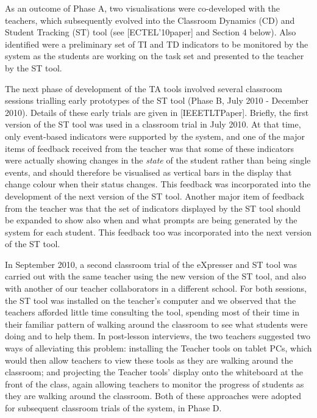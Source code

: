 As an outcome of Phase A, two visualisations were co-developed with
the teachers, which subsequently evolved into the Classroom Dynamics
(CD) and Student Tracking (ST) tool (see [ECTEL’10paper] and Section 4
below). Also identified were a preliminary set of TI and TD indicators
to be monitored by the system as the students are working on the task
set and presented to the teacher by the ST tool.

The next phase of development of the TA tools involved several
classroom sessions trialling early prototypes of the ST tool (Phase B,
July 2010 - December 2010). Details of these early trials are given in
[IEEETLTPaper]. Briefly, the first version of the ST tool was used in
a classroom trial in July 2010. At that time, only event-based
indicators were supported by the system, and one of the major items of
feedback received from the teacher was that some of these indicators
were actually showing changes in the {\em state} of the student rather
than being single events, and should therefore be visualised as
vertical bars in the display that change colour when their status
changes. This feedback was incorporated into the development of the
next version of the ST tool. Another major item of feedback from the
teacher was that the set of indicators displayed by the ST tool should
be expanded to show also when and what prompts are being generated by
the system for each student. This feedback too was incorporated into
the next version of the ST tool.
 
In September 2010, a second classroom trial of the eXpresser and ST
tool was carried out with the same teacher using the new version of
the ST tool, and also with another of our teacher collaborators in a
different school. For both sessions, the ST tool was installed on the
teacher’s computer and we observed that the teachers afforded little
time consulting the tool, spending most of their time in their
familiar pattern of walking around the classroom to see what students
were doing and to help them. In post-lesson interviews, the two
teachers suggested two ways of alleviating this problem: installing
the Teacher tools on tablet PCs, which would then allow teachers to
view these tools as they are walking around the classroom; and
projecting the Teacher tools' display onto the whiteboard at the front
of the class, again allowing teachers to monitor the progress of
students as they are walking around the classroom. Both of these
approaches were adopted for subsequent classroom trials of the system,
in Phase D.
 

